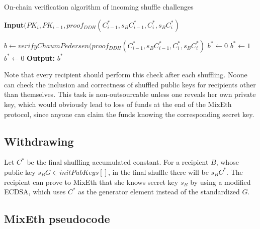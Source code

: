 \documentclass[a4paper]{article}
\theoremstyle{definition}
\begin{document}
\begin{algorithm}
	\caption{On-chain verification algorithm of incoming shuffle challenges}\label{verifyingshufflingoffchain}
	\hspace*{\algorithmicindent} \textbf{Input}$(PK_{i}, PK_{i-1}, proof_{DDH}(C^{*}_{i-1},s_{B}C^{*}_{i-1},C^{*}_{i},s_{B}C^{*}_{i})$ \\
	\begin{algorithmic}[1]
		\State $b\leftarrow verifyChaumPedersen(proof_{DDH}(C^{*}_{i-1},s_{B}C^{*}_{i-1}, C^{*}_{i},s_{B}C^{*}_{i})$ 
		\State $b^*\leftarrow0$
		\State $b^*\gets 1$
		\Else
		\State $b^*\gets 0$
		\EndIf
		\hspace*{\algorithmicindent} \textbf{Output:} $b^{*}$ 
	\end{algorithmic}   
\end{algorithm}
Note that every recipient should perform this check after each shuffling. Noone can check the inclusion and correctness of shuffled public keys for recipients other than themselves. This task is non-outsourcable unless one reveals her own private key, which would obviously lead to loss of funds at the end of the MixEth protocol, since anyone can claim the funds knowing the corresponding secret key.  

\subsection{Withdrawing}
Let $C^*$ be the final shuffling accumulated constant. For a recipient $B$, whose public key $s_{B}G \in initPubKeys[]$, in the final shuffle there will be $s_{B}C^*$. The recipient can prove to MixEth that she knows secret key $s_{B}$ by using a modified ECDSA, which uses $C^*$ as the generator element instead of the standardized $G$.
\subsection{MixEth pseudocode}
\end{document}
